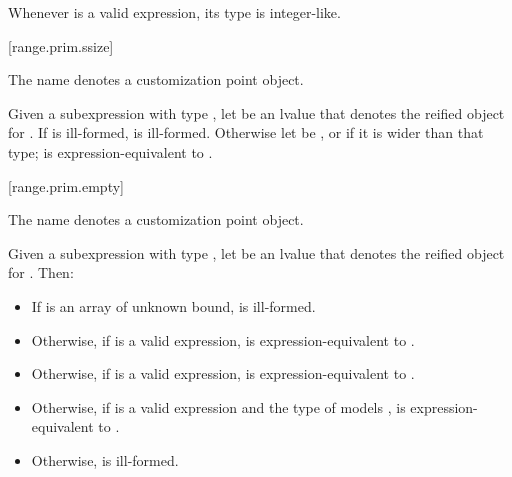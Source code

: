 \pnum
\begin{note}
Whenever  is a valid expression, its
type is integer-like.
\end{note}

[range.prim.ssize]{}
%

\pnum
The name  denotes
a customization point object.

\pnum
Given a subexpression  with type ,
let  be an lvalue that denotes the reified object for .
If  is ill-formed,
 is ill-formed.
Otherwise let  be
, or
 if it is wider than that type;
 is expression-equivalent to
.

[range.prim.empty]{}
%

\pnum
The name  denotes a customization point
object.

\pnum
Given a subexpression  with type ,
let  be an lvalue that denotes the reified object for .
Then:

\begin{itemize}
\item
  If  is an array of unknown bound,
   is ill-formed.

\item
  Otherwise, if  is a valid expression,
   is expression-equivalent to
  .

\item
  Otherwise, if  is a valid expression,
   is expression-equiva\-lent to
  .

\item
  Otherwise, if 
  is a valid expression and
  the type of  models ,
   is expression-equivalent to
  .

\item
  Otherwise,  is ill-formed.
\end{itemize}

